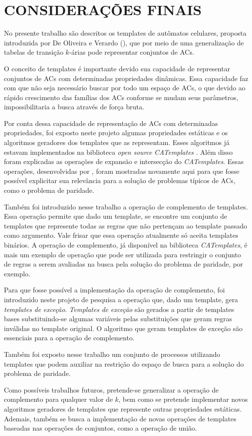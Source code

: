 \section{CONSIDERAÇÕES FINAIS}
\label{sec:consideracoesFinais}

No presente trabalho são descritos os templates de autômatos celulares, proposta introduzida por De Oliveira e Verardo (\citeyear{deOliveira2014}), que por meio de uma generalização de tabelas de transição $k$-árias pode representar conjuntos de ACs.

O conceito de templates é importante devido sua capacidade de representar conjuntos de ACs com determinadas propriedades dinâmicas. Essa capacidade faz com que não seja necessário buscar por todo um espaço de ACs, o que devido ao rápido crescimento das famílias dos ACs conforme se mudam seus parâmetros, impossibilitaria a busca através de força bruta.

Por conta dessa capacidade de representação de ACs com determinadas propriedades, foi exposto neste projeto algumas propriedades estáticas e os algoritmos geradores dos templates que as representam. Esses algoritmos já estavam implementados na biblioteca \textit{open source} \textit{CATemplates} \cite{CATemplates}. Além disso foram explicadas as operações de expansão e intersecção do \textit{CATemplates}. Essas operações, desenvolvidas por , foram mostradas novamente aqui para que fosse possível explicitar sua relevância para a solução de problemas típicos de ACs, como o problema de paridade.

Também foi introduzido nesse trabalho a operação de complemento de templates. Essa operação permite que dado um template, se encontre um conjunto de templates que represente todas as regras que não pertençam ao template passado como argumento. Vale frisar que essa operação atualmente só aceita templates binários. A operação de complemento, já disponível na biblioteca \textit{CATemplates}, é mais um exemplo de operação que pode ser utilizada para restringir o conjunto de regras a serem avaliadas na busca pela solução do problema de paridade, por exemplo.

Para que fosse possível a implementação da operação de complemento, foi introduzido neste projeto de pesquisa a operação que, dado um template, gera \textit{templates de exceção}. \textit{Templates de exceção} são gerados a partir de templates bases substituindo-se algumas variáveis pelas substituições que geram regras inválidas no template original. O algoritmo que geram templates de exceção são essenciais para a operação de complemento.

Também foi exposto nesse trabalho um conjunto de processos utilizando templates que podem auxiliar na restrição do espaço de busca para a solução do problema de paridade.

Como possíveis trabalhos futuros, pretende-se generalizar a operação de complemento para qualquer valor de $k$, bem como se pretende implementar novos algoritmos geradores de templates que represente outras propriedades estáticas. Ademais, também se busca a implementação de novas operações de templates baseadas nas operações de conjuntos, como a operação de união.

